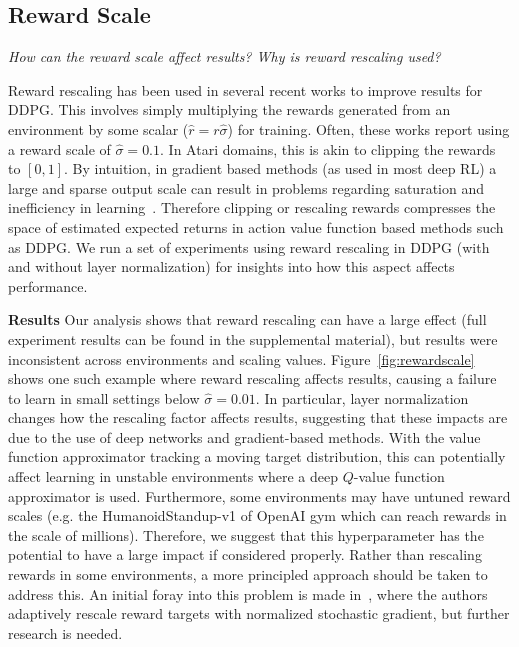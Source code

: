 \documentclass[letterpaper]{article} %
\begin{document}
\subsection{Reward Scale}

\textit{How can the reward scale affect results? Why is reward rescaling used?}
\medskip

\noindent Reward rescaling has been used in several recent works \cite{rllab,QPROP} to improve results for DDPG.
This involves simply multiplying the rewards generated from an environment by some scalar ($\hat{r} = r{\hat{\sigma}}$) for training.
Often, these works report using a reward scale of ${\hat{\sigma}}=0.1$. In Atari domains, this is akin to clipping the rewards to $[0,1]$.
By intuition, in gradient based methods (as used in most deep RL) a large and sparse output scale can result in problems regarding saturation and inefficiency in learning~\cite{lecun2012efficient,glorot2010understanding,vincent2015efficient}. Therefore clipping or rescaling rewards compresses the space of estimated expected returns in action value function based methods such as DDPG. We run a set of experiments using reward rescaling in DDPG (with and without layer normalization) for insights into how this aspect affects performance.

\textbf{Results} Our analysis shows that reward rescaling can have a large effect (full experiment results can be found in the supplemental material), but results were inconsistent across environments and scaling values. Figure~\ref{fig:rewardscale} shows one such example where reward rescaling affects results, causing a failure to learn in small settings below ${\hat{\sigma}}=0.01$. In particular, layer normalization changes how the rescaling factor affects results, suggesting that these impacts are due to the use of deep networks and gradient-based methods. With the value function approximator tracking a moving target distribution, this can potentially affect learning in unstable environments where a deep $Q$-value function approximator is used. Furthermore, some environments may have untuned reward scales (e.g. the HumanoidStandup-v1 of OpenAI gym which can reach rewards in the scale of millions). Therefore, we suggest that this hyperparameter has the potential to have a large impact if considered properly. Rather than rescaling rewards in some environments, a more principled approach should be taken to address this. An initial foray into this problem is made in~\cite{van2016learning}, where the authors adaptively rescale reward targets with normalized stochastic gradient, but further research is needed.
\end{document}
